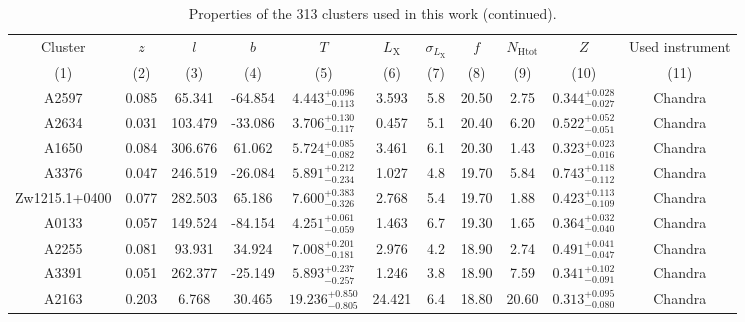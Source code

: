 \documentclass{aa}   %
\begin{document}
\begin{table}[h!]
\ContinuedFloat
\caption{\small{Properties of the 313 clusters used in this work (continued). }}

\begin{center}
\renewcommand{\arraystretch}{1.3}
\small
\begin{tabular}{ c  c  c  c c c c c c c c }
\hline \hline


Cluster  & $z$ & $l$ & $b$ & $T$  &  $L_{\text{X}}$ & $\sigma _{L_{\text{X}}}$  & $f$ & $N_{\text{Htot}}$ & $Z$ & Used instrument \\
(1) & (2) & (3) & (4) & (5) & (6) & (7) & (8) & (9) & (10) & (11) \\
\hline \hline

A2597               		&		0.085	&	65.341	&	-64.854	& $	4.443^{+0.096}_{-0.113}$  &      3.593	&  5.8	&	20.50	&	2.75	&	$ 0.344^{+0.028}_{-0.027}  $ &	  Chandra     \\
A2634               		&		0.031	&	103.479	&	-33.086	& $	3.706^{+0.130}_{-0.117}$  &      0.457	&  5.1	&	20.40	&	6.20	&	$ 0.522^{+0.052}_{-0.051}  $ &	 Chandra      \\
A1650               		&		0.084	&	306.676	&	61.062	& $	5.724^{+0.085}_{-0.082}$  &      3.461	&  6.1	&	20.30	&	1.43	&	$ 0.323^{+0.023}_{-0.016}  $ &	  Chandra     \\
A3376               		&		0.047	&	246.519	&	-26.084	& $	5.891^{+0.212}_{-0.234}$  &      1.027	&  4.8	&	19.70	&	5.84	&	$ 0.743^{+0.118}_{-0.112}  $ &	 Chandra      \\
Zw1215.1+0400       		&		0.077	&	282.503	&	65.186	& $	7.600^{+0.383}_{-0.326}$  &      2.768	&  5.4	&	19.70	&	1.88	&	$ 0.423^{+0.113}_{-0.109}  $ &	  Chandra     \\
A0133               		&		0.057	&	149.524	&	-84.154	& $	4.251^{+0.061}_{-0.059}$  &      1.463	&  6.7	&	19.30	&	1.65	&	$ 0.364^{+0.032}_{-0.040}  $ &	  Chandra     \\
A2255               		&		0.081	&	93.931	&	34.924	& $	7.008^{+0.201}_{-0.181}$  &      2.976	&  4.2	&	18.90	&	2.74	&	$ 0.491^{+0.041}_{-0.047}  $ &	  Chandra     \\
A3391               		&		0.051	&	262.377	&	-25.149	& $	5.893^{+0.237}_{-0.257}$  &      1.246	&  3.8	&	18.90	&	7.59	&	$ 0.341^{+0.102}_{-0.091}  $ &	 Chandra      \\
A2163               		&		0.203	&	6.768	&	30.465	& $ 19.236^{+0.850}_{-0.805}$ &      24.421	&  6.4	&	18.80	&   20.60	&	$ 0.313^{+0.095}_{-0.080}  $ &	 Chandra      \\

\end{tabular}
\end{center}
\end{table}
\end{document}
